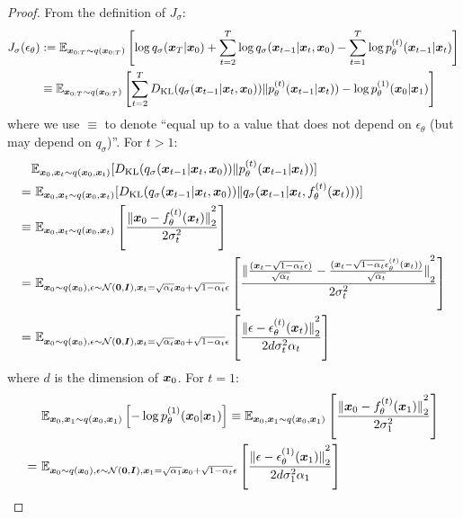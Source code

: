 \unifiedklobj*

\begin{proof}
From the definition of $J_\sigma$:
\begin{align}
   J_\sigma(\epsilon_\theta) & := {\mathbb{E}}_{{\bm{x}}_{0:T} \sim q({\bm{x}}_{0:T})} \left[\log q_\sigma({\bm{x}}_T | {\bm{x}}_0) + \sum_{t=2}^{T} \log q_\sigma({\bm{x}}_{t-1} | {\bm{x}}_t, {\bm{x}}_0) - \sum_{t=1}^{T} \log p_\theta^{(t)}({\bm{x}}_{t-1} | {\bm{x}}_t) \right] \\
   & \equiv {\mathbb{E}}_{{\bm{x}}_{0:T} \sim q({\bm{x}}_{0:T})} \left[\sum_{t=2}^{T} D_{\mathrm{KL}}(q_\sigma({\bm{x}}_{t-1} | {\bm{x}}_t, {\bm{x}}_0)) \Vert p_\theta^{(t)}({\bm{x}}_{t-1} | {\bm{x}}_t)) - \log p_\theta^{(1)}({\bm{x}}_0 | {\bm{x}}_1)  \right] \nonumber
\end{align}
where we use $\equiv$ to denote ``equal up to a value that does not depend on $\epsilon_\theta$ (but may depend on $q_\sigma$)''. For $t > 1$:
\begin{align}
   & {\mathbb{E}}_{{\bm{x}}_{0}, {\bm{x}}_t \sim q({\bm{x}}_{0}, {\bm{x}}_t)} [D_{\mathrm{KL}}(q_\sigma({\bm{x}}_{t-1} | {\bm{x}}_t, {\bm{x}}_0)) \Vert p_\theta^{(t)}({\bm{x}}_{t-1} | {\bm{x}}_t))] \nonumber \\
   = & \ {\mathbb{E}}_{{\bm{x}}_{0}, {\bm{x}}_t \sim q({\bm{x}}_{0}, {\bm{x}}_t)}[D_{\mathrm{KL}}(q_\sigma({\bm{x}}_{t-1} | {\bm{x}}_t, {\bm{x}}_0)) \Vert q_\sigma({\bm{x}}_{t-1} | {\bm{x}}_t, f_{\theta}^{(t)}({\bm{x}}_t)))] \nonumber \\
   \equiv & \ {\mathbb{E}}_{{\bm{x}}_{0}, {\bm{x}}_t \sim q({\bm{x}}_{0}, {\bm{x}}_t)}\left[\frac{{\lVert {{\bm{x}}_0 - f_{\theta}^{(t)}({\bm{x}}_t)} \rVert}_2^2}{2 \sigma_t^2}\right] \\
   = & \ {\mathbb{E}}_{{\bm{x}}_{0} \sim q({\bm{x}}_{0}), \epsilon \sim {\mathcal{N}}({\bm{0}}, {\bm{I}}), {\bm{x}}_t = \sqrt{\alpha_t} {\bm{x}}_0 + \sqrt{1 - \alpha_t} \epsilon}\left[\frac{{\lVert {\frac{{({\bm{x}}_t - \sqrt{1 - \alpha_t} \epsilon)}}{\sqrt{\alpha_t}} - \frac{({\bm{x}}_t - \sqrt{1 - \alpha_t} \epsilon_{\theta}^{(t)}({\bm{x}}_t))}{\sqrt{\alpha_t}}} \rVert}_2^2}{2 \sigma_t^2}\right] \\
   = & \ {\mathbb{E}}_{{\bm{x}}_{0} \sim q({\bm{x}}_{0}), \epsilon \sim {\mathcal{N}}({\bm{0}}, {\bm{I}}), {\bm{x}}_t = \sqrt{\alpha_t} {\bm{x}}_0 + \sqrt{1 - \alpha_t} \epsilon}\left[\frac{{\lVert {\epsilon - \epsilon_{\theta}^{(t)}({\bm{x}}_t)} \rVert}_2^2}{2 d \sigma_t^2 \alpha_t}\right]
\end{align}
where $d$ is the dimension of ${\bm{x}}_0$. For $t = 1$:
\begin{align}
   & \ \bb{E}_{\vx_{0}, \vx_1 \sim q(\vx_{0}, \vx_1)} \left[ - \log p_\theta^{(1)}(\vx_0 | \vx_1)  \right] \equiv \bb{E}_{\vx_{0}, \vx_1 \sim q(\vx_{0}, \vx_1)}\left[\frac{\norm{\vx_0 - f_{\theta}^{(t)}(\vx_1)}_2^2}{2 \sigma_1^2}\right] \\
   = & \ \bb{E}_{\vx_{0} \sim q(\vx_{0}), \epsilon \sim \gN(\vzero, \mI), \vx_1 = \sqrt{\alpha_1} \vx_0 + \sqrt{1 - \alpha_t} \epsilon}\left[\frac{\norm{\epsilon - \epsilon_{\theta}^{(1)}(\vx_1)}_2^2}{2 d \sigma_1^2 \alpha_1}\right]

\end{align}
\end{proof}

